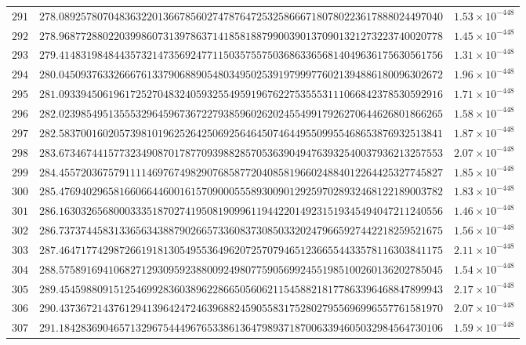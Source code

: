 \documentclass[12pt,reqno]{amsart}
\theoremstyle{remark}
\begin{document}
\begin{longtable}{clc}
$291$ & $278.0892578070483632201366785602747876472532586667180780223617888024497040$ & $1.53\times 10^{-448}$ \\
$292$ & $278.9687728802203998607313978637141858188799003901370901321273223740020778$ & $1.45\times 10^{-448}$ \\
$293$ & $279.4148319848443573214735692477115035755750368633656814049636175630561756$ & $1.31\times 10^{-448}$ \\
$294$ & $280.0450937633266676133790688905480349502539197999776021394886180096302672$ & $1.96\times 10^{-448}$ \\
$295$ & $281.0933945061961725270483240593255495919676227535553111066842378530592916$ & $1.71\times 10^{-448}$ \\
$296$ & $282.0239854951355532964596736722793859602620245549917926270644626801866265$ & $1.58\times 10^{-448}$ \\
$297$ & $282.5837001602057398101962526425069256464507464495509955468653876932513841$ & $1.87\times 10^{-448}$ \\
$298$ & $283.6734674415773234908701787709398828570536390494763932540037936213257553$ & $2.07\times 10^{-448}$ \\
$299$ & $284.4557203675791111469767498290768587720408581966024884012264425327745827$ & $1.85\times 10^{-448}$ \\
$300$ & $285.4769402965816606644600161570900055589300901292597028932468122189003782$ & $1.83\times 10^{-448}$ \\
$301$ & $286.1630326568000333518702741950819099611944220149231519345494047211240556$ & $1.46\times 10^{-448}$ \\
$302$ & $286.7373744583133656343887902665733608373085033202479665927442218259521675$ & $1.56\times 10^{-448}$ \\
$303$ & $287.4647177429872661918130549553649620725707946512366554433578116303841175$ & $2.11\times 10^{-448}$ \\
$304$ & $288.5758916941068271293095923880092498077590569924551985100260136202785045$ & $1.54\times 10^{-448}$ \\
$305$ & $289.4545988091512546992836038962286650560621154588218177863396468847899943$ & $2.17\times 10^{-448}$ \\
$306$ & $290.4373672143761294139642472463968824590558317528027955696996557761581970$ & $2.07\times 10^{-448}$ \\
$307$ & $291.1842836904657132967544496765338613647989371870063394605032984564730106$ & $1.59\times 10^{-448}$ \\

\end{longtable}
\end{document}
